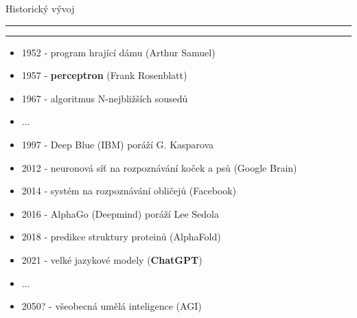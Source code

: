 \documentclass[aspectratio=43]{beamer}
\def\vs{\vspace{-2mm}}
\def\lend{\phantom{g}\vspace{1.5mm}\hrule\hrule}
\begin{document}
\begin{frame}{\vs Historický vývoj \lend}
\vspace{6mm}
\begin{itemize}
    \small
    \item[] 1952 - program hrající dámu (Arthur Samuel)\\ \vspace{0.85mm}
    \item[] 1957 - \textbf{perceptron} (Frank Rosenblatt)\\ \vspace{0.85mm}
    \item[] 1967 -  algoritmus N-nejbližších sousedů\\ \vspace{0.85mm}
    \item[] ...\\ \vspace{0.85mm}
    \item[] 1997 - Deep Blue (IBM) poráží G. Kasparova\\ \vspace{0.85mm}
    \item[] 2012 - neuronová síť na rozpoznávání koček a psů (Google Brain)\\ \vspace{0.85mm}
    \item[] 2014 - systém na rozpoznávání obličejů (Facebook)\\ \vspace{0.85mm}
    \item[] 2016 - AlphaGo (Deepmind) poráží Lee Sedola\\ \vspace{0.85mm}
    \item[] 2018 - predikce struktury proteinů (AlphaFold)\\ \vspace{0.85mm}
    \item[] 2021 - velké jazykové modely (\textbf{ChatGPT})\\ \vspace{0.85mm}
    \item[] ...\\ \vspace{0.85mm}
    \item[] 2050? - všeobecná umělá inteligence (AGI)\\

\end{itemize}
\end{frame}
\end{document}

